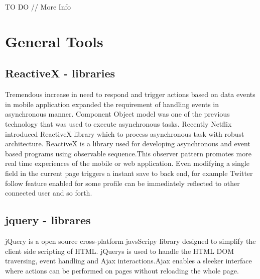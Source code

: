 		TO DO // More Info			

\section{General Tools}

\subsection{ReactiveX - libraries}

			Tremendous increase in need to respond and trigger actions based on data events in mobile application expanded the requirement of handling events in asynchronous manner. Component Object model was one of the previous technology that was used to execute asynchronous tasks. Recently Netflix introduced ReactiveX library which to process asynchronous task with robust architecture. ReactiveX is a library used for developing asynchronous  and event based programs using observable sequence.This observer pattern promotes more real time experiences of the mobile or web application. Even modifying a single field in the current page triggers a instant save to back end, for example Twitter follow feature enabled for some profile can be immediately reflected to other connected user and so forth. 
			
\subsection{jquery - librares}
					jQuery is a open source cross-platform javsScripy library designed to simplify the client side scripting of HTML. jQuerys is used to handle the HTML DOM traversing, event handling and Ajax interactions.Ajax enables a sleeker interface where actions can be performed on pages without reloading the whole page.
					 
